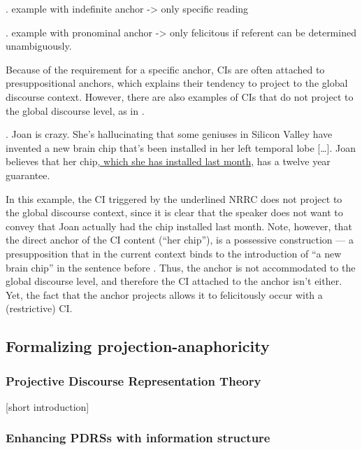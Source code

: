 \ex. example with indefinite anchor -> only specific reading

\ex. example with pronominal anchor -> only felicitous if referent can be
  determined unambiguously.

Because of the requirement for a specific anchor, CIs are often attached to
presuppositional anchors, which explains their tendency to project to the
global discourse context. However, there are also examples of CIs that do
not project to the global discourse level, as in \Next \citep[example
from][]{amaral2007review}.

\ex. Joan is crazy. She's hallucinating that some geniuses in Silicon Valley
have invented a new brain chip that's been installed in her left temporal
lobe [\ldots]. Joan believes that her chip\underline{, which she has
installed last month,} has a twelve year guarantee.

In this example, the CI triggered by the underlined NRRC does not project to
the global discourse context, since it is clear that the speaker does not
want to convey that Joan actually had the chip installed last month. Note,
however, that the direct anchor of the CI content (``her chip''), is
a possessive construction --- a presupposition that in the current context
binds to the introduction of ``a new brain chip'' in the sentence before
\citep[following][]{sandt1992presupposition}.  Thus, the anchor is not
accommodated to the global discourse level, and therefore the CI attached to
the anchor isn't either. Yet, the fact that the anchor projects allows it to
felicitously occur with a (restrictive) CI.


\subsection{Formalizing projection-anaphoricity}

\subsubsection{Projective Discourse Representation Theory}

[short introduction]

\subsubsection{Enhancing PDRSs with information structure}

